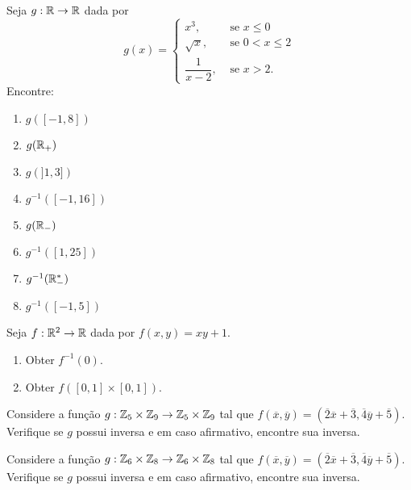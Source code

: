 \documentclass[12pt]{exam}
\begin{document}
\vspace{.3cm}

\questao{} Seja $g : \mathbb{R} \to \mathbb{R}$ dada por
\[
    g(x) = \begin{cases}
        x^3,& \mbox{ se } x \le 0\\
        \sqrt{x}, & \mbox{ se } 0 < x \le 2\\
        \dfrac{1}{x - 2}, & \mbox{ se } x > 2.
    \end{cases}
\]
Encontre:
\begin{multicols}{2}
    \begin{enumerate}[label={\alph*})]
        \item $g([-1,8])$
        \item $g(\mathbb{R}_+)$
        \item $g(]1, 3])$
        \item $g^{-1}([-1,16])$
        \item $g(\mathbb{R}_-)$
        \item $g^{-1}([1,25])$
        \item $g^{-1}(\mathbb{R}^*_-)$
        \item $g^{-1}([-1,5])$
    \end{enumerate} 
\end{multicols}

\vspace{.3cm}

\questao{} Seja $f: \mathbb{R}^2 \to \mathbb{R}$ dada por $f(x,y) = xy + 1$.
\begin{enumerate}[label={\alph*})]
    \item Obter $f^{-1}({0})$.
    \item Obter $f([0,1]\times [0,1])$.
\end{enumerate}

\vspace{.3cm}


\questao{} Considere a fun{\c c}{\~a}o $g : \mathbb{Z}_5 \times \mathbb{Z}_9 \to \mathbb{Z}_5 \times \mathbb{Z}_9$ tal que $f(\overline{x},\overline{y}) = (\overline{2} \overline{x} + \overline{3}, \overline{4}\overline{y} + \overline{5})$. Verifique se $g$ possui inversa e em caso afirmativo, encontre sua inversa.

\vspace{.3cm}

\questao{} Considere a fun{\c c}{\~a}o $g : \mathbb{Z}_6 \times \mathbb{Z}_8 \to \mathbb{Z}_6 \times \mathbb{Z}_8$ tal que $f(\overline{x},\overline{y}) = (\overline{2} \overline{x} + \overline{3}, \overline{4}\overline{y} + \overline{5})$. Verifique se $g$ possui inversa e em caso afirmativo, encontre sua inversa.
\end{document}
